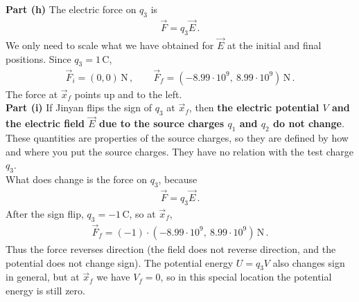 \documentclass[11pt]{article}
\begin{document}
\noindent\textbf{Part (h)} The electric force on $q_3$ is
\begin{align*}
\vec{F}=q_3\vec{E}\,.
\end{align*}
We only need to scale what we have obtained for $\vec{E}$ at the initial and final positions. Since $q_3=1$\,C, 
\begin{align*}
\vec{F}_i=(0,0)\,\text{N}\,,\qquad
\vec{F}_f
=(-8.99\cdot 10^9,\ 8.99\cdot 10^9)\,\text{N}\,.
\end{align*}
The force at $\vec{x}_f$ points up and to the left.\\

\noindent\textbf{Part (i)} If Jinyan flips the sign of $q_3$ at $\vec{x}_f$, then \textbf{the electric potential $V$ and the electric field $\vec{E}$ due to the source charges $q_1$ and $q_2$ do not change}. These quantities are properties of the source charges, so they are defined by how and where you put the source charges. They have no relation with the test charge $q_3$.\\

What does change is the force on $q_3$, because
\begin{align*}
\vec{F}=q_3\vec{E}\,.
\end{align*}
After the sign flip, $q_3=-1$\,C, so at $\vec{x}_f$,
\begin{align*}
\vec{F}_f=(-1)\cdot (-8.99\cdot 10^9,\ 8.99\cdot 10^9)\,\text{N}\,.
\end{align*}
Thus the force reverses direction (the field does not reverse direction, and the potential does not change sign). The potential energy $U=q_3V$ also changes sign in general, but at $\vec{x}_f$ we have $V_f=0$, so in this special location the potential energy is still zero.\\
\end{document}
